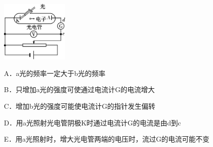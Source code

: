 \begin{center}\includegraphics[width=1.30208in,height=1.17917in]{media/image468.png}\end{center}
A．a光的频率一定大于b光的频率

B．只增加a光的强度可使通过电流计G的电流增大

C．增加b光的强度可能使电流计G的指针发生偏转

D．用a光照射光电管阴极K时通过电流计G的电流是由d到c

E．用a光照射时，增大光电管两端的电压时，流过G的电流可能不变
\newpage
